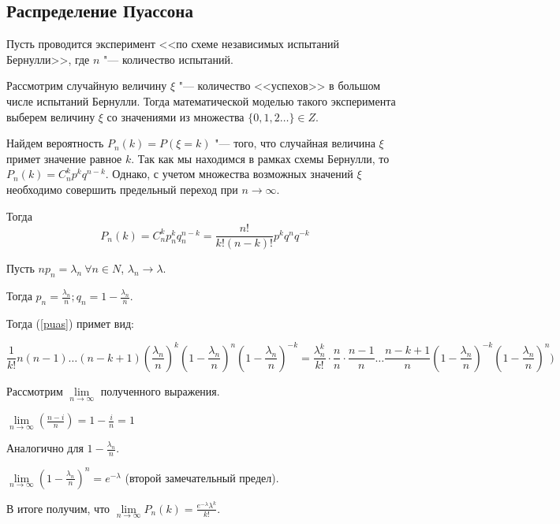 \subsection{Распределение Пуассона}
Пусть проводится эксперимент <<по схеме
независимых испытаний Бернулли>>, где
$n$ "--- количество испытаний.

Рассмотрим случайную величину $\xi$ "---
количество <<успехов>> в большом числе
испытаний Бернулли. Тогда математической
моделью такого эксперимента выберем величину
$\xi$ со значениями из множества $\{0, 1, 2 \dots\} \in Z$.

Найдем вероятность $P_n(k) = P(\xi = k)$ "--- того, что
случайная величина $\xi$ примет значение
равное $k$. Так как мы находимся в рамках
схемы Бернулли, то
$P_n(k) = C_n^kp^kq^{n - k}$. Однако, с учетом
множества возможных значений $\xi$ необходимо
совершить предельный переход при $n \rightarrow \infty$.

Тогда
\begin{equation} \label{puas}
    \displaystyle P_n(k) = C_n^k p_n^k q_n^{n - k} = \frac{n!}{k!(n - k)!}p^k q^n q^{-k}
\end{equation}

Пусть $np_n = \lambda_n ~\forall n \in N$, $\lambda_n \rightarrow \lambda$.

Тогда $p_n = \frac{\lambda_n}{n}; q_n = 1 - \frac{\lambda_n}{n}$.

Тогда (\ref{puas}) примет вид:

\begin{equation*}
    \displaystyle 
    \frac{1}{k!} n (n - 1) \dots (n - k + 1) (\frac{\lambda_n}{n})^k(1 - \frac{\lambda_n}{n})^n (1 - \frac{\lambda_n}{n})^{-k} = 
    \frac{\lambda_n^k}{k!} \cdot \frac{n}{n} \cdot \frac{n - 1}{n} \dots \frac{n - k + 1}{n} (1 - \frac{\lambda_n}{n})^{-k} (1 - \frac{\lambda_n}{n})^n)
\end{equation*}

Рассмотрим $\lim\limits_{n \rightarrow \infty}$ полученного выражения.

$\displaystyle \lim\limits_{n \rightarrow \infty}(\frac{n - i}{n}) = 1 - \frac{i}{n} = 1$

Аналогично для $\displaystyle 1 - \frac{\lambda_n}{n}$.

$\displaystyle \lim\limits_{n \rightarrow \infty}(1 - \frac{\lambda_n}{n})^n = e^{-\lambda}$ (второй замечательный предел).

В итоге получим, что $\displaystyle \lim\limits_{n \rightarrow \infty}P_n(k)
 = \frac{e^{-\lambda} \lambda^k}{k!}$.

